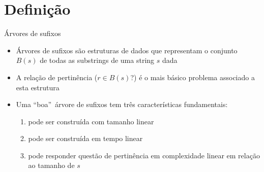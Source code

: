 \section{Definição}

\begin{frame}[fragile]{Árvores de sufixos}

    \begin{itemize}
        \item Árvores de sufixos são estruturas de dados que representam o conjunto 
            $B(s)$ de todas as substrings de uma string $s$ dada

        \item A relação de pertinência ($r \in B(s)$?) é o mais básico problema associado a esta 
            estrutura

        \item Uma ``boa''\ árvore de sufixos tem três características fundamentais:

        \begin{enumerate}
            \item pode ser construída com tamanho linear
            \item pode ser construída em tempo linear
            \item pode responder questão de pertinência em complexidade linear em relação ao tamanho de $s$
        \end{enumerate}

    \end{itemize}

\end{frame}

